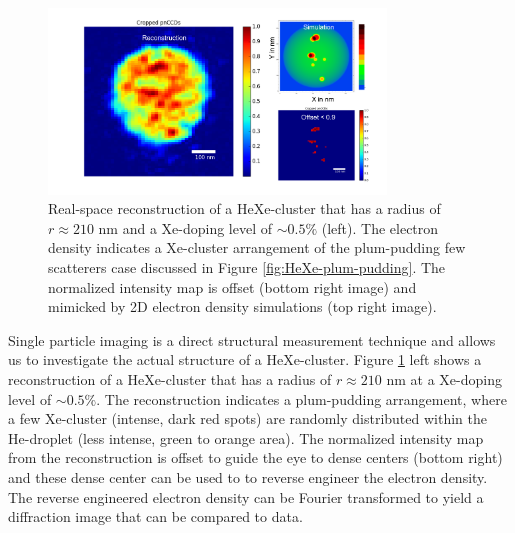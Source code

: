 \begin{figure}
 	\centering
 		\includegraphics[width=0.80\textwidth]{images/results/reconstructions-to-simulations.png}
 	\caption[Reconstruction of HeXe-clusters and simulated electron densities.]{Real-space reconstruction of a HeXe-cluster that has a radius of $r\approx 210$ nm and a Xe-doping level of $\sim 0.5\%$ (left). The electron density indicates a Xe-cluster arrangement of the plum-pudding few scatterers case discussed in Figure \ref{fig:HeXe-plum-pudding}. The normalized intensity map is offset (bottom right image) and mimicked by 2D electron density simulations (top right image).}
 	\label{fig:HeXe-cluster-60}
\end{figure}
Single particle imaging is a direct structural measurement technique and allows us to investigate the actual structure of a HeXe-cluster. Figure \ref{fig:HeXe-cluster-60} left shows a reconstruction of a HeXe-cluster that has a radius of $r\approx 210$ nm at a Xe-doping level of $\sim 0.5 \%$. The reconstruction indicates a plum-pudding arrangement, where a few Xe-cluster (intense, dark red spots) are randomly distributed within the He-droplet (less intense, green to orange area). The normalized intensity map from the reconstruction is offset to guide the eye to dense centers (bottom right) and these dense center can be used to to reverse engineer the electron density. The reverse engineered electron density can be Fourier transformed to yield a diffraction image that can be compared to data.
%
%
%
%
%
%
